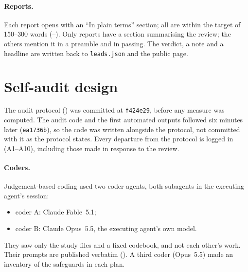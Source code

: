 \documentclass[11pt]{article}
\begin{document}
\paragraph{Reports.} Each report opens with an ``In plain terms'' section; all \PlainN{} are within the target of
150--300 words (\PlainWordsMin{}--\PlainWordsMax{}). Only \ReviewSections{} reports have a section summarising the
review; the others mention it in a preamble and in passing. The verdict, a note and a headline are written back to
\texttt{leads.json} and the public page.

\section{Self-audit design}
\label{sec:audit}

The audit protocol () was committed at \texttt{f424e29}, before any measure was computed. The
audit code and the first automated outputs followed six minutes later (\texttt{ea1736b}), so the code was written
alongside the protocol, not committed with it as the protocol states. Every departure from the protocol is logged in
 (A1--A10), including those made in response to the review.

\paragraph{Coders.} Judgement-based coding used two coder agents, both subagents in the executing agent's session:
\begin{itemize}
\item coder A: Claude Fable~5.1;
\item coder B: Claude Opus~5.5, the executing agent's own model.
\end{itemize}
They saw only the study files and a fixed codebook, and not each other's work. Their prompts are published verbatim
(). A third coder (Opus~5.5) made an inventory of the safeguards in each plan.
\end{document}
